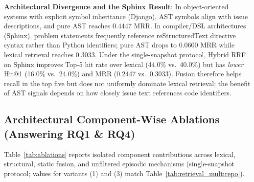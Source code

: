 \documentclass[conference]{IEEEtran}
\begin{document}
\textbf{Architectural Divergence and the Sphinx Result}: In object-oriented systems with explicit symbol inheritance (Django), AST symbols align with issue descriptions, and pure AST reaches 0.4447 MRR. In compiler/DSL architectures (Sphinx), problem statements frequently reference reStructuredText directive syntax rather than Python identifiers; pure AST drops to 0.0600 MRR while lexical retrieval reaches 0.3033. Under the single-snapshot protocol, Hybrid RRF on Sphinx improves Top-5 hit rate over lexical (44.0\% vs.\ 40.0\%) but has \emph{lower} Hit@1 (16.0\% vs.\ 24.0\%) and MRR (0.2447 vs.\ 0.3033). Fusion therefore helps recall in the top five but does not uniformly dominate lexical retrieval; the benefit of AST signals depends on how closely issue text references code identifiers.

\subsection{Architectural Component-Wise Ablations (Answering RQ1 \& RQ4)}
Table~\ref{tab:ablations} reports isolated component contributions across lexical, structural, static fusion, and unfiltered episodic mechanisms (single-snapshot protocol; values for variants (1) and (3) match Table~\ref{tab:retrieval_multirepo}).

\begin{table}[!t]
\caption{Architectural Component-Wise Retrieval Ablations}
\label{tab:ablations}
\centering
\setlength{\tabcolsep}{3pt}
\end{table}
\end{document}
